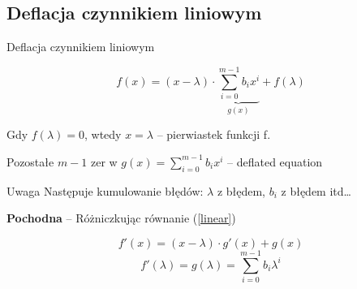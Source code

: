 \subsection{Deflacja czynnikiem liniowym}

\begin{frame}{Deflacja czynnikiem liniowym}
  \begin{block}{}
    \begin{equation} f(x) = (x - \lambda) \cdot \underbrace{\sum_{i=0}^{m-1} b_i x^i}_{g(x)} + f(\lambda) \label{linear} \end{equation}
  \end{block}
  Gdy $f(\lambda) = 0$, wtedy $x = \lambda$ -- pierwiastek funkcji f.

  \vspace{5px}

  Pozostałe $m - 1$ zer w $ g(x) = \sum_{i=0}^{m-1} b_i x^i $ -- deflated equation

  \vspace{5px}

  \begin{alertblock}{Uwaga}
    Następuje kumulowanie błędów: $\lambda$ z błędem, $b_i$ z błędem itd\dots
  \end{alertblock}
\end{frame}

\begin{frame}
  \textbf{Pochodna} -- Różniczkując równanie (\ref{linear})

  $$ f'(x) = (x - \lambda) \cdot g'(x) + g(x) $$
  $$ f'(\lambda) = g(\lambda) = \sum_{i=0}^{m-1} b_i \lambda^i$$
\end{frame}
